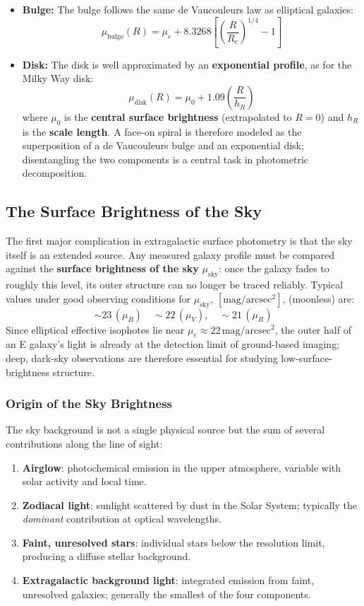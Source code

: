 \begin{itemize}
    \item \textbf{Bulge:} The bulge follows the same de Vaucouleurs law as elliptical galaxies:
    $$
    \mu_\mathrm{bulge}(R) = \mu_e + 8.3268\left[\left(\frac{R}{R_e}\right)^{1/4} - 1\right]
    $$

    \item \textbf{Disk:} The disk is well approximated by an \textbf{exponential profile}, as for the Milky Way disk:
    $$
    \mu_\mathrm{disk}(R) = \mu_0 + 1.09\left(\frac{R}{h_R}\right)
    $$
    where $\mu_0$ is the \textbf{central surface brightness} (extrapolated to $R=0$) and $h_R$ is the \textbf{scale length}. A face-on spiral is therefore modeled as the superposition of a de Vaucouleurs bulge and an exponential disk; disentangling the two components is a central task in photometric decomposition.
\end{itemize}

\subsection{The Surface Brightness of the Sky}

The first major complication in extragalactic surface photometry is that the sky itself is an extended source. Any measured galaxy profile must be compared against the \textbf{surface brightness of the sky} $\mu_\mathrm{sky}$: once the galaxy fades to roughly this level, its outer structure can no longer be traced reliably. Typical values under good observing conditions for $\mu_\mathrm{sky}$,  $[\mathrm{mag/arcsec^2}]$, (moonless) are:
$$
\sim 23\, (\mu_B) \quad \sim 22\, (\mu_V), \quad \sim 21\,(\mu_R)
$$
Since elliptical effective isophotes lie near $\mu_e \approx 22\,\mathrm{mag/arcsec^2}$, the outer half of an E galaxy's light is already at the detection limit of ground-based imaging; deep, dark-sky observations are therefore essential for studying low-surface-brightness structure.

\subsubsection{Origin of the Sky Brightness}

The sky background is not a single physical source but the sum of several contributions along the line of sight:

\begin{enumerate}
    \item \textbf{Airglow}: photochemical emission in the upper atmosphere, variable with solar activity and local time.
    \item \textbf{Zodiacal light}: sunlight scattered by dust in the Solar System; typically the \textit{dominant} contribution at optical wavelengths.
    \item \textbf{Faint, unresolved stars}: individual stars below the resolution limit, producing a diffuse stellar background.
    \item \textbf{Extragalactic background light}: integrated emission from faint, unresolved galaxies; generally the smallest of the four components.
\end{enumerate}

